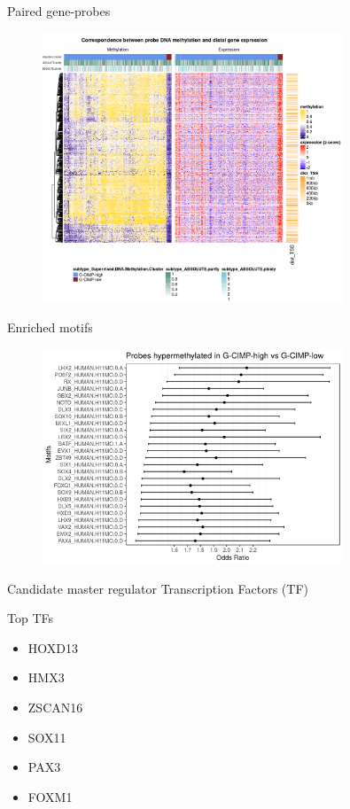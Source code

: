 \documentclass[slidestop,compress,11pt,xcolor=dvipsnames]{beamer}
\begin{document}
\begin{frame}{Paired gene-probes}
\vspace{-0.5cm}
 \begin{figure}[ht!]
  \centering
  \includegraphics[width=0.8\textwidth]{glioma/heatmap.png}
  \caption{}
 \end{figure}
\end{frame}


\begin{frame}{Enriched motifs}
 \begin{figure}[ht!]
  \centering
  \includegraphics[width=0.8\textwidth]{glioma/or.png}
 \end{figure}
\end{frame}


\begin{frame}{Candidate master regulator Transcription Factors (TF) }
\vspace{-0.5cm}
\begin{exampleblock}{Top TFs}
  \begin{itemize}
    \item  HOXD13
    \item  HMX3
    \item  ZSCAN16
    \item  SOX11
    \item  PAX3
    \item  FOXM1
  \end{itemize}
\end{exampleblock}
\end{frame}
\end{document}
